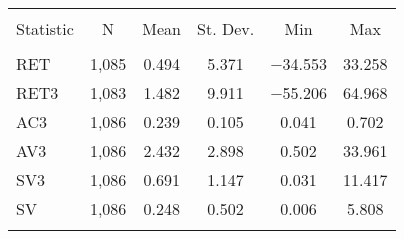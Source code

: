 
\begin{table}[!htbp] \centering 
  \caption{} 
  \label{} 
\begin{tabular}{@{\extracolsep{5pt}}lccccc} 
\\[-1.8ex]\hline 
\hline \\[-1.8ex] 
Statistic & \multicolumn{1}{c}{N} & \multicolumn{1}{c}{Mean} & \multicolumn{1}{c}{St. Dev.} & \multicolumn{1}{c}{Min} & \multicolumn{1}{c}{Max} \\ 
\hline \\[-1.8ex] 
RET & 1,085 & 0.494 & 5.371 & $-$34.553 & 33.258 \\ 
RET3 & 1,083 & 1.482 & 9.911 & $-$55.206 & 64.968 \\ 
AC3 & 1,086 & 0.239 & 0.105 & 0.041 & 0.702 \\ 
AV3 & 1,086 & 2.432 & 2.898 & 0.502 & 33.961 \\ 
SV3 & 1,086 & 0.691 & 1.147 & 0.031 & 11.417 \\ 
SV & 1,086 & 0.248 & 0.502 & 0.006 & 5.808 \\ 
\hline \\[-1.8ex] 
\end{tabular} 
\end{table} 
